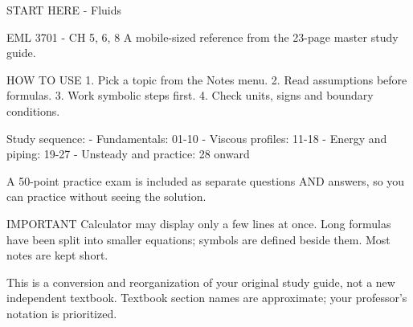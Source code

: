 START HERE - Fluids

EML 3701 - CH 5, 6, 8
A mobile-sized reference from the 23-page master study guide.

HOW TO USE
1. Pick a topic from the Notes menu.
2. Read assumptions before formulas.
3. Work symbolic steps first.
4. Check units, signs and boundary conditions.

Study sequence:
- Fundamentals: 01-10
- Viscous profiles: 11-18
- Energy and piping: 19-27
- Unsteady and practice: 28 onward

A 50-point practice exam is included as separate questions AND answers, so you can practice without seeing the solution.

IMPORTANT
Calculator may display only a few lines at once. Long formulas have been split into smaller equations; symbols are defined beside them. Most notes are kept short.

This is a conversion and reorganization of your original study guide, not a new independent textbook. Textbook section names are approximate; your professor's notation is prioritized.

